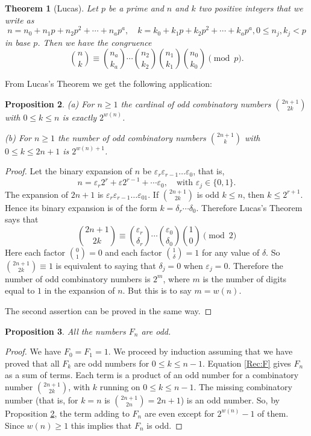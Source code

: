 \documentclass[10pt]{amsart}
\newtheorem{thm}{Theorem}
\newtheorem{prop}[thm]{Proposition}
\theoremstyle{definition}
\theoremstyle{remark}
\begin{document}
\begin{thm}[Lucas]
Let $p$ be a prime and $n$ and $k$ two positive integers that we write as
\[n=n_0+n_1p+n_2p^2+\cdots+n_a p^a,\quad k=k_0+k_1p+k_2p^2+\cdots+k_a p^a, 0\le n_j,k_j<p\]
in base $p$.  Then we have the congruence
\[\binom{n}{k}\equiv\binom{n_a}{k_a}\cdots\binom{n_2}{k_2}\binom{n_1}{k_1}\binom{n_0}{k_0}
\pmod{p}.\]
\end{thm}

From Lucas's Theorem we get the following application:
\begin{prop}\label{P:afterLucas}
(a) For $n\ge1$ the cardinal of odd combinatory numbers $\binom{2n+1}{2k}$
with $0\le k\le n$ is exactly $2^{w(n)}$.

(b) For $n\ge 1$ the number of odd combinatory numbers $\binom{2n+1}{k}$
with $0\le k\le 2n+1$ is  $2^{w(n)+1}$.

\end{prop}

\begin{proof}
Let the binary expansion of $n$ be $\varepsilon_r\varepsilon_{r-1}\dots\varepsilon_0$, that is,
\[n=\varepsilon_r2^r+\varepsilon2^{r-1}+\cdots \varepsilon_0,\quad \text{with }
\varepsilon_j\in\{0,1\}.\]
The expansion of $2n+1$ is $\varepsilon_r\varepsilon_{r-1}\dots\varepsilon_01$.
If $\binom{2n+1}{2k}$ is odd $k\le n$, then $k\le 2^{r+1}$. Hence its
binary expansion is
of the form $k=\delta_r\cdots \delta_0$. Therefore Lucas's Theorem says that
\[\binom{2n+1}{2k}\equiv \binom{\varepsilon_r}{\delta_r}\cdots
\binom{\varepsilon_0}{\delta_0}\binom{1}{0}\pmod{2}\]
Here each factor $\binom{0}{1}=0$ and each factor $\binom{1}{\delta}=1$ for
any value of $\delta$.  So $\binom{2n+1}{2k}\equiv1$ is equivalent to saying that
$ \delta_j=0$ when $\varepsilon_j=0$. Therefore the number of odd combinatory
numbers is $2^{m}$, where $m$ is the number of digits equal to $1$ in
the expansion of $n$. But
this is to say $m=w(n)$.

The second assertion can be proved in the same way.
\end{proof}

\begin{prop}
All the numbers $F_n$  are odd.
\end{prop}

\begin{proof}
We have $F_0=F_1=1$. We proceed by induction assuming that we have proved that
all $F_k$ are odd numbers for $0\le k\le n-1$.
Equation \eqref{Rec:F} gives $F_n$ as a sum of terms. Each term is a product
of an odd number for a combinatory number $\binom{2n+1}{2k}$, with $k$ running on
$0\le k\le n-1$. The missing combinatory number
(that is, for $k=n$ is $\binom{2n+1}{2n}=2n+1$) is an
odd number. So, by Proposition \ref{P:afterLucas}, the term adding to $F_n$ are even except for $2^{w(n)}-1$ of them. Since
$w(n)\ge1$ this implies that $F_n$ is odd.
\end{proof}
\end{document}
